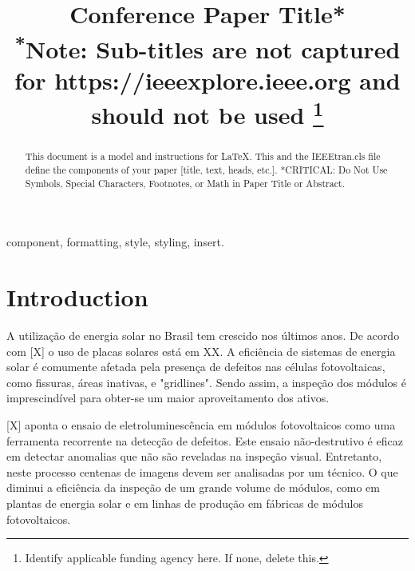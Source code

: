 \documentclass[conference]{IEEEtran}
\begin{document}
\title{Conference Paper Title*\\
{\footnotesize \textsuperscript{*}Note: Sub-titles are not captured for
https://ieeexplore.ieee.org  and
should not be used}
\thanks{Identify applicable funding agency here. If none, delete this.}
}

\author{
}

\maketitle

\begin{abstract}
    This document is a model and instructions for \LaTeX.
    This and the IEEEtran.cls file define the components of your paper [title,
            text, heads, etc.]. *CRITICAL: Do Not Use Symbols, Special
    Characters,
    Footnotes,
    or Math in Paper Title or Abstract.
\end{abstract}

\begin{IEEEkeywords}
    component, formatting, style, styling, insert.
\end{IEEEkeywords}

\section{Introduction}
A utilização de energia solar no Brasil tem crescido nos últimos anos. De
acordo com [X] o uso de
placas solares está em XX. A eficiência de sistemas de energia solar é
comumente afetada pela presença de
defeitos nas células fotovoltaicas, como fissuras, áreas inativas,
e "gridlines". Sendo assim, a inspeção dos módulos é imprescindível para
obter-se um maior aproveitamento dos ativos.

    [X] aponta o ensaio de eletroluminescência
em módulos fotovoltaicos como uma ferramenta recorrente na detecção de
defeitos. Este
ensaio não-destrutivo é eficaz em detectar anomalias que não são reveladas na
inspeção visual. Entretanto, neste processo centenas de imagens devem ser
analisadas por um
técnico. O que diminui a eficiência da inspeção de um grande volume de módulos,
como em plantas de energia
solar e em linhas de produção em fábricas de módulos fotovoltaicos.
\end{document}
